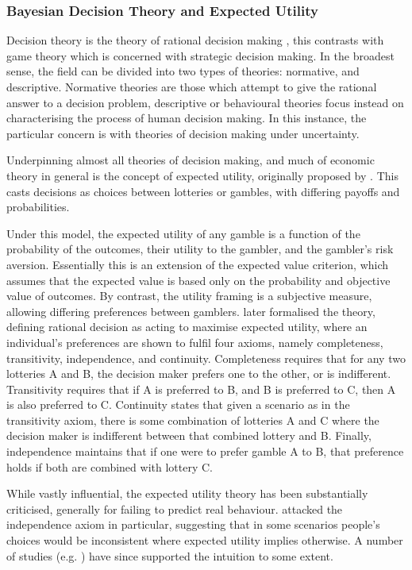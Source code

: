 \subsubsection{Bayesian Decision Theory and Expected Utility}

Decision theory is the theory of rational decision making \citep{Peterson2009},
this contrasts with game theory which is concerned with strategic
decision making. In the broadest sense, the field can be divided into
two types of theories: normative, and descriptive. Normative theories
are those which attempt to give the rational answer to a decision
problem, descriptive or behavioural theories focus instead on characterising
the process of human decision making. In this instance, the particular
concern is with theories of decision making under uncertainty.

Underpinning almost all theories of decision making, and much of economic
theory in general is the concept of expected utility, originally proposed
by \citet{Bernoulli1954}. This casts decisions as choices between
lotteries or gambles, with differing payoffs and probabilities.

Under this model, the expected utility of any gamble is a function
of the probability of the outcomes, their utility to the gambler,
and the gambler's risk aversion. Essentially this is an extension
of the expected value criterion, which assumes that the expected value
is based only on the probability and objective value of outcomes.
By contrast, the utility framing is a subjective measure, allowing
differing preferences between gamblers. \citet{Neumann1953} later
formalised the theory, defining rational decision as acting to maximise
expected utility, where an individual's preferences are shown to fulfil
four axioms, namely completeness, transitivity, independence, and
continuity. Completeness requires that for any two lotteries A and
B, the decision maker prefers one to the other, or is indifferent.
Transitivity requires that if A is preferred to B, and B is preferred
to C, then A is also preferred to C. Continuity states that given
a scenario as in the transitivity axiom, there is some combination
of lotteries A and C where the decision maker is indifferent between
that combined lottery and B. Finally, independence maintains that
if one were to prefer gamble A to B, that preference holds if both
are combined with lottery C.

While vastly influential, the expected utility theory has been substantially
criticised, generally for failing to predict real behaviour. \citet{Society2013}
attacked the independence axiom in particular, suggesting that in
some scenarios people's choices would be inconsistent where expected
utility implies otherwise. A number of studies (e.g. \citep{Oliver2003,Burke1996})
have since supported the intuition to some extent.

